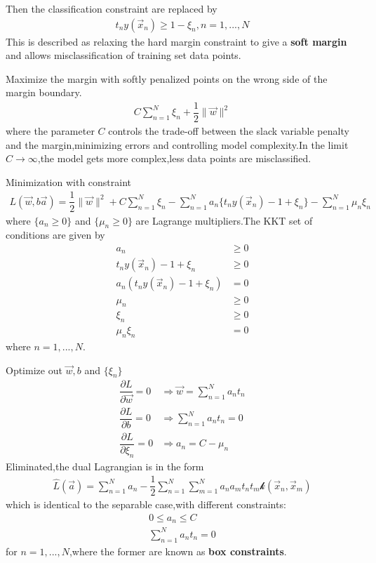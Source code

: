 Then the classification constraint are replaced by
\begin{align}
t_n y(\vec{x}_n) \geq 1-\xi_n,n=1,...,N
\end{align}
This is described as relaxing the hard margin constraint to give a \textbf{soft margin} and allows misclassification of training set data points.

Maximize the margin with softly penalized points on the wrong side of the margin boundary.
\begin{align}
C\sum_{n=1}^{N}\xi_n +\dfrac{1}{2}\parallel\vec{w}\parallel^2
\end{align}
where the parameter $C$ controls the trade-off between the slack variable penalty and the margin,minimizing errors and controlling model complexity.In the limit $C\longrightarrow \infty$,the model gets more complex,less data points are misclassified.

Minimization with constraint
\begin{align}
L(\vec{w},b\vec{a}) =\dfrac{1}{2}\parallel\vec{w}\parallel^2+C\sum_{n=1}^{N}\xi_n-\sum_{n=1}^{N}a_n\{t_n y(\vec{x}_n)-1+\xi_n \} -\sum_{n=1}^{N}\mu_n\xi_n
\end{align}
where $\{a_n\geq 0\}$ and $\{\mu_n \geq 0 \}$ are Lagrange multipliers.The KKT set of conditions are given by
\begin{align}
a_n &\geq 0 \\
t_n y(\vec{x}_n)-1+\xi_n &\geq 0 \\
a_n(t_n y(\vec{x}_n)-1+\xi_n) &= 0 \\
\mu_n &\geq 0 \\
\xi_n &\geq 0 \\
\mu_n\xi_n &=0
\end{align}
where $n=1,...,N$.

Optimize out $\vec{w},b$ and $\{\xi_n\}$
\begin{align}
\dfrac{\partial L}{\partial\vec{w}} =0 &\Rightarrow \vec{w}=\sum_{n=1}^{N}a_n t_n \\ 
\dfrac{\partial L}{\partial b}=0 &\Rightarrow \sum_{n=1}^{N}a_n t_n =0 \\
\dfrac{\partial L}{\partial \xi_n} =0 &\Rightarrow a_n = C-\mu_n
\end{align}
Eliminated,the dual Lagrangian is in the form
\begin{align}\label{eqn:SVM Lagrangian}
\hat{L}(\vec{a}) = \sum_{n=1}^{N}a_n -\dfrac{1}{2}\sum_{n=1}^{N}\sum_{m=1}^{N}a_n a_m t_n t_m \mathcal{k}(\vec{x}_n,\vec{x}_m)
\end{align}
which is identical to the separable case,with different constraints:
\begin{align}
0\leq a_n \leq C\\
\sum_{n=1}^{N}a_n t_n = 0
\end{align}
for $n=1,...,N$,where the former are known as \textbf{box constraints}.

